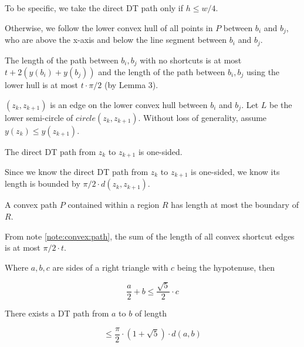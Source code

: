 \documentclass{tufte-handout}
\begin{document}
To be specific, we take the direct DT path only if $h \le w/4$.

Otherwise, we follow the lower convex hull of all points in $P$
between $b_i$ and $b_j$, who are above the x-axis and below the line
segment between $b_i$ and $b_j$.

The length of the path between $b_i,b_j$ with no shortcuts is at most
$t + 2(y(b_i) + y(b_j))$ and the length of the path between $b_i,b_j$
using the lower hull is at most $t \cdot \pi /2$ (by Lemma 3).


$(z_k,z_{k+1})$ is an edge on the lower convex hull between $b_i$ and
$b_j$.  Let $L$ be the lower semi-circle of $circle(z_k, z_{k+1})$.
Without loss of generality, assume $y(z_k) \le y(z_{k+1})$.

\begin{Lemma}

  \label{lemma:convex:path:one:sided}

  The direct DT path from $z_k$ to $z_{k+1}$ is one-sided.
  
\end{Lemma}

Since we know the direct DT path from $z_k$ to $z_{k+1}$ is one-sided,
we know its length is bounded by $\pi/2 \cdot d(z_k,z_{k+1})$.

\begin{Note}
  \label{note:convex:path}

  A convex path $P$ contained within a region $R$ has length at most
  the boundary of $R$.

\end{Note}

From note \ref{note:convex:path}, the sum of the length of all convex
shortcut edges is at most $\pi/2 \cdot t$.

\begin{Note}
  \label{note:right:triangle}

  Where $a,b,c$ are sides of a right triangle with $c$ being the
  hypotenuse, then

  \begin{displaymath}
    \frac{a}{2} + b \le \frac{\sqrt{5}}{2} \cdot c
  \end{displaymath}
  
\end{Note}

\begin{Theorem}

  There exists a DT path from $a$ to $b$ of length

  \begin{displaymath}
    \le \frac{\pi}{2} \cdot (1 + \sqrt{5}) \cdot d(a,b)
  \end{displaymath}

\end{Theorem}
\end{document}
